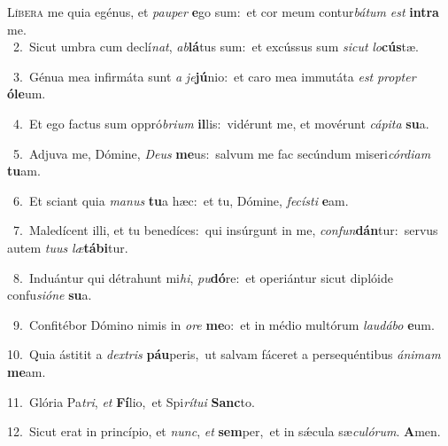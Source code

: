 \lettrine{\initial\textcolor{\initialcolor}{L}}{íbera} me quia egénus, et \textit{pau}\-\textit{per} \textbf{e}\-go sum:~\star et cor meum contur\-\textit{bá}\-\textit{tum} \textit{est} \textbf{in}\-\textbf{tra} me.\\
{\numbfont\textcolor{\numbcolor}{~2.}}~Sicut umbra cum declí\-\textit{nat}\-, \textit{ab}\-\textbf{lá}tus sum:~\star et excússus sum \textit{sic}\-\textit{ut} \textit{lo}\-\textbf{cús}tæ.\par
{\numbfont\textcolor{\numbcolor}{~3.}}~Génua mea infirmáta sunt \textit{a} \textit{je}\-\textbf{jú}nio:~\star et caro mea immutáta \textit{est} \textit{prop}\-\textit{ter} \textbf{ó}\-\textbf{le}um.\par
{\numbfont\textcolor{\numbcolor}{~4.}}~Et ego factus sum oppró\-\textit{bri}\-\textit{um} \textbf{il}\-lis:~\star vidérunt me, et movérunt \textit{cá}\-\textit{pi}\textit{ta} \textbf{su}\-a.\par
{\numbfont\textcolor{\numbcolor}{~5.}}~Adjuva me, Dómine, \textit{De}\-\textit{us} \textbf{me}\-us:~\star salvum me fac secúndum miseri\-\textit{cór}\-\textit{di}\textit{am} \textbf{tu}\-am.\par
{\numbfont\textcolor{\numbcolor}{~6.}}~Et sciant quia \textit{ma}\-\textit{nus} \textbf{tu}\-a hæc:~\star et tu, Dómine, \textit{fe}\-\textit{cís}\textit{ti} \textbf{e}\-am.\par
{\numbfont\textcolor{\numbcolor}{~7.}}~Maledícent illi, et tu benedíces:~\dagger qui insúrgunt in me, \textit{con}\-\textit{fun}\textbf{dán}tur:~\star servus autem \textit{tu}\-\textit{us} \textit{læ}\-\textbf{tá}\textbf{bi}tur.\par
{\numbfont\textcolor{\numbcolor}{~8.}}~Induántur qui détrahunt mi\-\textit{hi}\-, \textit{pu}\-\textbf{dó}re:~\star et operiántur sicut diplóide confu\-\textit{si}\-\textit{ó}\textit{ne} \textbf{su}\-a.\par
{\numbfont\textcolor{\numbcolor}{~9.}}~Confitébor Dómino nimis in \textit{o}\-\textit{re} \textbf{me}\-o:~\star et in médio multórum \textit{lau}\-\textit{dá}\textit{bo} \textbf{e}\-um.\par
{\numbfont\textcolor{\numbcolor}{10.}}~Quia ástitit a \textit{dex}\-\textit{tris} \textbf{páu}\-peris,~\star ut salvam fáceret a persequéntibus \textit{á}\-\textit{ni}\textit{mam} \textbf{me}\-am.\par
{\numbfont\textcolor{\numbcolor}{11.}}~Glória Pa\-\textit{tri}\-, \textit{et} \textbf{Fí}\-lio,~\star et Spi\-\textit{rí}\-\textit{tu}\textit{i} \textbf{Sanc}\-to.\par
{\numbfont\textcolor{\numbcolor}{12.}}~Sicut erat in princípio, et \textit{nunc}\-, \textit{et} \textbf{sem}\-per,~\star et in sǽcula sæ\-\textit{cu}\-\textit{ló}\textit{rum}. \textbf{A}\-men.\par
